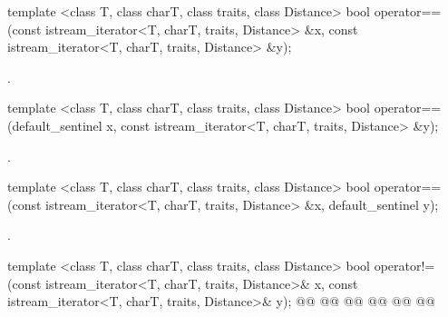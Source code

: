 %
%
\begin{itemdecl}
template <class T, class charT, class traits, class Distance>
  bool operator==(const istream_iterator<T, charT, traits, Distance> &x,
                  const istream_iterator<T, charT, traits, Distance> &y);
\end{itemdecl}

\begin{itemdescr}
\pnum
\returns
{}.%
\end{itemdescr}

{\color{newclr}
\begin{itemdecl}
template <class T, class charT, class traits, class Distance>
  bool operator==(default_sentinel x,
                  const istream_iterator<T, charT, traits, Distance> &y);
\end{itemdecl}

\begin{itemdescr}
\pnum
\returns
{}.%
\end{itemdescr}

\begin{itemdecl}
template <class T, class charT, class traits, class Distance>
  bool operator==(const istream_iterator<T, charT, traits, Distance> &x,
                  default_sentinel y);
\end{itemdecl}

\begin{itemdescr}
\pnum
\returns
{}.%
\end{itemdescr}
}

%
%
\begin{itemdecl}
template <class T, class charT, class traits, class Distance>
  bool operator!=(const istream_iterator<T, charT, traits, Distance>& x,
                  const istream_iterator<T, charT, traits, Distance>& y);
@@
  @@
                  @@
@@
  @@
                  @@
\end{itemdecl}

